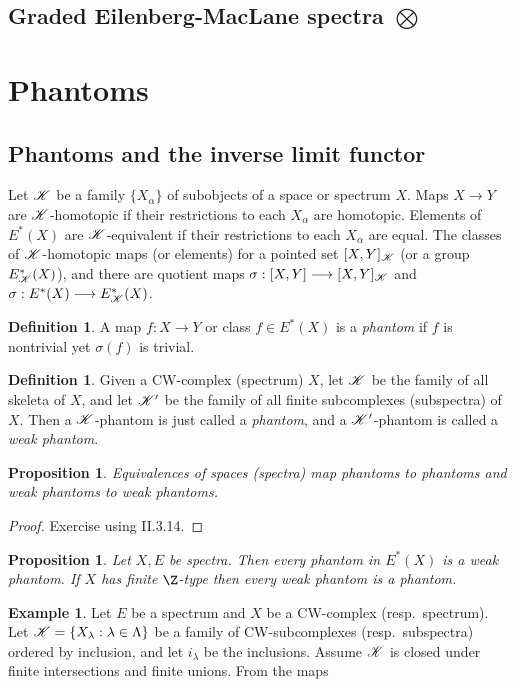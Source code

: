 \documentclass[11pt]{article}
\renewcommand{\comment}{}
\theoremstyle{plain}
\newtheorem{prop}[thm]{Proposition}
\theoremstyle{definition}
\newtheorem{defn}[thm]{Definition}
\newtheorem{exmp}[thm]{Example}
\begin{document}
\subsection{Graded Eilenberg-MacLane spectra \texorpdfstring{$\bigotimes$}{}}
\section{Phantoms}
\subsection{Phantoms and the inverse limit functor}
\comment{
Let $\mathscr{K}$ be a family $\{X_\alpha\}$ of subobjects of a space or spectrum $X$.
Maps $X\to Y$ are $\mathscr{K}$-homotopic if their restrictions to each $X_\alpha$ are
homotopic. Elements of $E^*(X)$ are $\mathscr{K}$-equivalent if their restrictions to
each $X_\alpha$ are equal. The classes of $\mathscr{K}$-homotopic maps (or elements)
for a pointed set $[X,Y]_{\mathscr{K}}$ (or a group $E^*_{\mathscr{K}}(X)$), and there are
quotient maps $\sigma:[X,Y]\longrightarrow[X,Y]_{\mathscr{K}}$ and $\sigma:E^*(X)\longrightarrow E^*_{\mathscr{K}}(X)$.
\begin{defn}
A map $f:X\to Y$ or class $f\in E^*(X)$ is a \emph{phantom} if $f$ is nontrivial
yet $\sigma(f)$ is trivial.
\end{defn}
\begin{defn}
Given a CW-complex (spectrum) $X$, let $\mathscr{K}$ be the family of all skeleta of
$X$, and let $\mathscr{K}'$ be the family of all finite subcomplexes (subspectra) of
$X$. Then a $\mathscr{K}$-phantom is just called a \emph{phantom}, and a
$\mathscr{K}'$-phantom is called a \emph{weak phantom}.
\end{defn}
\begin{prop}
Equivalences of spaces (spectra) map phantoms to phantoms and weak phantoms to
weak phantoms.
\end{prop}
\begin{proof}
Exercise using II.3.14.
\end{proof}
\begin{prop}
Let $X,E$ be spectra. Then every phantom in $E^*(X)$ is a weak phantom. If $X$
has finite $\Z$-type then every weak phantom is a phantom.
\end{prop}
\setcounter{thm}{11}
\begin{exmp}
Let $E$ be a spectrum and $X$ be a CW-complex (resp.\ spectrum). Let
$\mathscr{K}=\{X_\lambda:\lambda\in\Lambda\}$ be a family of CW-subcomplexes (resp.\
subspectra) ordered by inclusion, and let $i_\lambda$ be the inclusions. Assume
$\mathscr{K}$ is closed under finite intersections and finite unions. From the maps

\end{exmp}}
\end{document}
